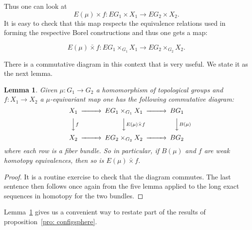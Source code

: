 \documentclass{amsart}
\newtheorem{lem}[thm]{Lemma}
\begin{document}
Thus one can look at
$$
E(\mu) \times f : EG_1 \times X_1 \rightarrow EG_2 \times X_2.
$$
It is easy to check that this map respects the equivalence relations
used in forming the 
respective Borel constructions and thus one gets a map:

$$
E(\mu) \bar{\times} f : EG_1 \times_{G_1} X_1 \rightarrow EG_2 \times_{G_2}
X_2.
$$ 

There is a commutative diagram in this context that is very useful.
We state it as the next lemma.

\begin{lem}
\label{lem: CD for Borel}
Given $\mu: G_1 \rightarrow G_2$ a homomorphism of topological groups
and $f: X_1 \rightarrow X_2$ a $\mu$-equivariant map one has
the following commutative diagram:
$$
\begin{CD}
X_1 @>>> EG_1 \times_{G_1} X_1 @>>> BG_1 \\
@VV f V @VV E(\mu) \bar{\times} f V @VV B(\mu) V \\
X_2 @>>> EG_2 \times_{G_2} X_2 @>>> BG_2 
\end{CD}
$$
where each row is a fiber bundle.
So in particular, if $B(\mu)$ and $f$ are weak homotopy equivalences,
then so is $E(\mu) \bar{\times} f$. 
\end{lem}
\begin{proof}
It is a routine exercise to check that the diagram commutes.
The last sentence then follows once again from the five lemma
applied to the long exact sequences in homotopy for the
two bundles.
\end{proof}

Lemma~\ref{lem: CD for Borel} gives us a convenient way to restate 
part of the
results of proposition~\ref{pro: configsphere}.
\end{document}

